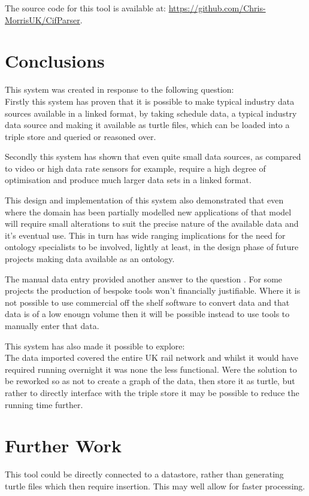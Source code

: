 The source code for this tool is available at: \url{https://github.com/Chris-MorrisUK/CifParser}.

\section{Conclusions}

This system was created in response to the following question: \textit{\QuestionOtherData}\\

Firstly this system has proven that it is possible to make typical industry data sources available in a linked format, by taking schedule data, a typical industry data source and making it available as turtle files, which can be loaded into a triple store and queried or reasoned over. 

Secondly this system has shown that even quite small data sources, as compared to video or high data rate sensors for example, require a high degree of optimisation and produce much larger data sets in a linked format. 

This design and implementation of this system also demonstrated that even where the domain has been partially modelled new applications of that model will require small alterations to suit the precise nature of the available data and it's eventual use. This in turn has wide ranging implications for the need for ontology specialists to be involved, lightly at least, in the design phase of future projects making data available as an ontology.

The manual data entry provided another answer to the question \say{\QuestionOtherData}. For some projects the production of bespoke tools won't financially justifiable. Where it is not possible to use commercial off the shelf software to convert data and that data is of a low enougn volume then it will be possible instead to use tools to manually enter that data.

This system has also made it possible to explore: \textit{\QuestionOtherData} \\
The data imported covered the entire UK rail network and whilst it would have required running overnight it was none the less functional. Were the solution to be reworked so as not to create a graph of the data, then store it as turtle, but rather to directly interface with the triple store it may be possible to reduce the running time further.

\section{Further Work}
This tool could be directly connected to a datastore, rather than generating turtle files which then require insertion. This may well allow for faster processing.